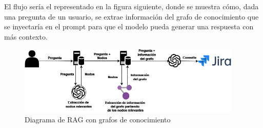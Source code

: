 El flujo sería el representado en la figura siguiente, donde se muestra cómo, dada una pregunta de un usuario, se extrae información del grafo de conocimiento que se inyectaría en el prompt para que el modelo pueda generar una respuesta con más contexto.

\begin{figure}[H]
    \centering
    \includegraphics[width=0.95\textwidth]{images/rag_grafo.png}
    \caption{Diagrama de RAG con grafos de conocimiento}\label{fig:kg}
\end{figure}
